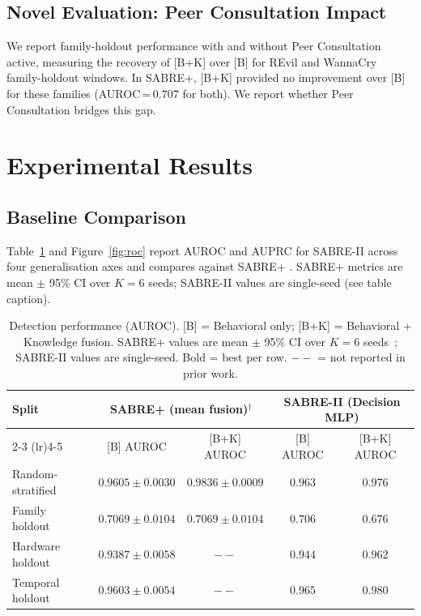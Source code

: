 \documentclass[journal]{IEEEtran}
\begin{document}
\subsection{Novel Evaluation: Peer Consultation Impact}

We report family-holdout performance with and without Peer Consultation
active, measuring the recovery of [B+K] over [B] for REvil and WannaCry
family-holdout windows.
In SABRE+, [B+K] provided no improvement over [B] for these families
(AUROC\,=\,$0.707$ for both).
We report whether Peer Consultation bridges this gap.


\section{Experimental Results}
\label{sec:results}

\subsection{Baseline Comparison}

Table~\ref{tab:main_results} and Figure~\ref{fig:roc} report AUROC and AUPRC for SABRE-II
across four generalisation axes and compares against SABRE+
\cite{kabuye_sabre_2026}.
SABRE+ metrics are mean $\pm$ 95\% CI over $K=6$ seeds; SABRE-II values are single-seed (see table caption).

\begin{table}[t]
\centering
\caption{Detection performance (AUROC).
  [B] = Behavioral only; [B+K] = Behavioral + Knowledge fusion.
  SABRE+ values are mean $\pm$ 95\% CI over $K=6$ seeds~\cite{kabuye_sabre_2026};
  SABRE-II values are single-seed.
  Bold = best per row.
  $--$ = not reported in prior work.
}
\label{tab:main_results}
\setlength{\tabcolsep}{4pt}
\begin{tabular}{lcccc}
\toprule
\multirow{2}{*}{Split} & \multicolumn{2}{c}{SABRE+ (mean fusion)$^\dagger$} & \multicolumn{2}{c}{SABRE-II (Decision MLP)} \\
\cmidrule(lr){2-3} \cmidrule(lr){4-5}
 & [B] AUROC & [B+K] AUROC & [B] AUROC & [B+K] AUROC \\
\midrule
Random-stratified   & $0.9605 \pm 0.0030$ & $0.9836 \pm 0.0009$ & $0.963$ & $\mathbf{0.976}$ \\
Family holdout      & $0.7069 \pm 0.0104$ & $0.7069 \pm 0.0104$ & $\mathbf{0.706}$ & $0.676$ \\
Hardware holdout    & $0.9387 \pm 0.0058$ & $--$                & $0.944$ & $\mathbf{0.962}$ \\
Temporal holdout    & $0.9603 \pm 0.0054$ & $--$                & $0.965$ & $\mathbf{0.980}$ \\
\bottomrule
\end{tabular}
\end{table}
\end{document}

